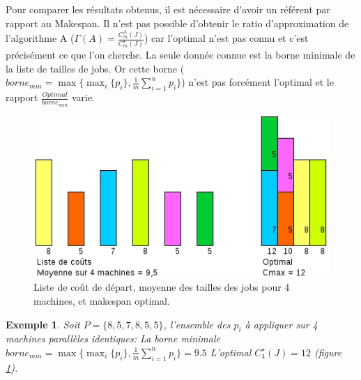 \documentclass[a4paper,12pt]{report}
\theoremstyle{plain}				%
\newtheorem{example}{Exemple}
\theoremstyle{definition}				%
\begin{document}
Pour comparer les résultats obtenus, il est nécessaire d'avoir un référent par rapport au Makespan. 
Il n'est pas possible d'obtenir le ratio d'approximation de l'algorithme A ($\Gamma(A)=\frac{C_m^A(J)}{C_m^\star(J)}$) car l'optimal n'est pas connu et c'est précisément ce que l'on cherche. 
La seule donnée connue est la borne minimale de la liste de tailles de jobs.
Or cette borne ($borne_{min} = \max \{ \max_i\{p_i\}, \frac{1}{m} \sum_{i=1}^{n} p_i \}$) n'est pas forcément l'optimal et le rapport $\frac{Optimal}{borne_{min}}$ varie.

\bigskip

\begin{figure}
{\centering
\includegraphics[width=\columnwidth]{MoyenneVsOptimal.jpg}
\caption{Liste de coût de départ, moyenne des tailles des jobs pour 4 machines, et makespan optimal.}
\label{ex:borneMinVSOptimalListeDepart}
\par}
\end{figure}

\begin{example}
Soit $P=\{8, 5, 7, 8, 5, 5\}$, l'ensemble des $p_i$ à appliquer sur 4 machines parallèles identiques:
La borne minimale $borne_{min} = \max \{ \max_i\{p_i\}, \frac{1}{m} \sum_{i=1}^{n} p_i \} = 9.5$ 
L'optimal $C_4^\star(J) = 12$ (figure \ref{ex:borneMinVSOptimalListeDepart}).
\end{example}
\end{document}
